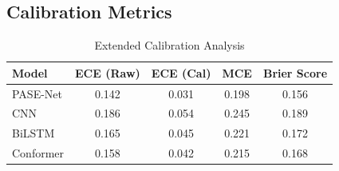\documentclass[10pt,a4paper]{article}
\begin{document}
\subsection{Calibration Metrics}

\begin{table}[h!]
\centering
\caption{Extended Calibration Analysis}
\begin{tabular}{lcccc}
\toprule
\textbf{Model} & \textbf{ECE (Raw)} & \textbf{ECE (Cal)} & \textbf{MCE} & \textbf{Brier Score} \\
\midrule
PASE-Net & 0.142 & 0.031 & 0.198 & 0.156 \\
CNN & 0.186 & 0.054 & 0.245 & 0.189 \\
BiLSTM & 0.165 & 0.045 & 0.221 & 0.172 \\
Conformer & 0.158 & 0.042 & 0.215 & 0.168 \\
\bottomrule
\end{tabular}
\end{table}
\end{document}
